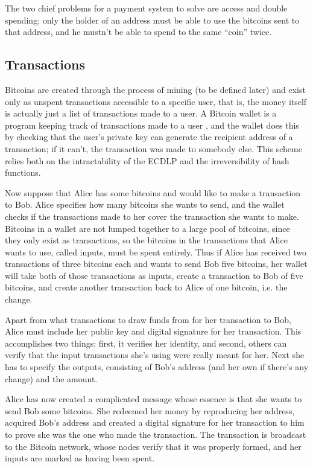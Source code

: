 \documentclass[a4paper,12pt]{article}
\begin{document}
The two chief problems for a payment system to solve are access and double spending; only the holder of an address must be able to use the bitcoins sent to that address, and he mustn't be able to spend to the same “coin” twice.

\subsection{Transactions}

Bitcoins are created through the process of mining (to be defined later) and exist only as unspent transactions accessible to a specific user, that is, the money itself is actually just a list of transactions made to a user. A Bitcoin wallet is a program keeping track of transactions made to a user \cite{wallet}, and the wallet does this by checking that the user's private key can generate the recipient address of a transaction; if it can't, the transaction was made to somebody else. This scheme relies both on the intractability of the ECDLP and the irreversibility of hash functions.

Now suppose that Alice has some bitcoins and would like to make a transaction to Bob. Alice specifies how many bitcoins she wants to send, and the wallet checks if the transactions made to her cover the transaction she wants to make. Bitcoins in a wallet are not lumped together to a large pool of bitcoins, since they only exist as transactions, so the bitcoins in the transactions that Alice wants to use, called inputs, must be spent entirely. Thus if Alice has received two transactions of three bitcoins each and wants to send Bob five bitcoins, her wallet will take both of those transactions as inputs, create a transaction to Bob of five bitcoins, and create another transaction back to Alice of one bitcoin, i.e. the change. \cite[p. 10]{kobmen}

Apart from what transactions to draw funds from for her transaction to Bob, Alice must include her public key and digital signature for her transaction. This accomplishes two things: first, it verifies her identity, and second, others can verify that the input transactions she's using were really meant for her. Next she has to specify the outputs, consisting of Bob's address (and her own if there's any change) and the amount.

Alice has now created a complicated message whose essence is that she wants to send Bob some bitcoins. She redeemed her money by reproducing her address, acquired Bob's address and created a digital signature for her transaction to him to prove she was the one who made the transaction. The transaction is broadcast to the Bitcoin network, whose nodes verify that it was properly formed, and her inputs are marked as having been spent. \cite{mastering}
\end{document}
